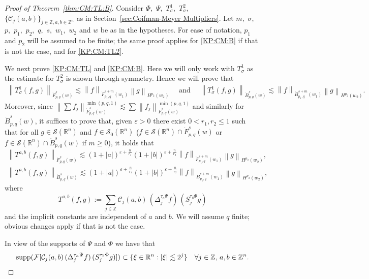 \documentclass[10pt,a4paper]{article}
\theoremstyle{remark}
\newcommand{\ent}{\mathbb{Z}}
\newcommand{\rn}{{{\mathbb R}^n}}
\newcommand{\sw}{{\mathcal{S}}(\rn)}
\newcommand{\swz}{{\mathcal{S}_0}(\rn)}
\newcommand{\tlw}[4]{\dot F_{#1,#3}^{#2}(#4)} %
\newcommand{\besw}[4]{\dot B_{#1,#3}^{#2}(#4)} %
\newcommand{\C}{\mathcal{C}}
\newcommand{\Do}[2]{\Delta^{#1}_{#2}}
\newcommand{\So}[2]{S^{#1}_{#2}}
\newcommand{\abs}[1]{\left\vert #1 \right\vert}
\newcommand{\norm}[2]{\left\|#1\right\|_{#2}}
\newcommand{\supp}{{\rm{supp}}}
\begin{document}
 \begin{proof}[Proof of Theorem~\ref{thm:CM:TL:B}] Consider $\Phi,$ $\Psi,$ $T_\sigma^1,$ $T_\sigma^2,$ $\{\C_j(a,b)\}_{j\in\ent,a,b\in\ent^n}$ as in Section~\ref{sec:Coifman-Meyer Multipliers}. Let $m,$ $\sigma,$ $p,$ $p_1,$ $p_2,$ $q,$ $s,$ $w_1,$ $w_2$ and $w$ be as in the hypotheses.  
For ease of notation, $p_1$ and $p_2$ will be assumed to be finite; the same proof applies for \eqref{KP:CM:B} if that is not the case, and for \eqref{KP:CM:TL2}.


We next prove \eqref{KP:CM:TL} and \eqref{KP:CM:B}. Here we will only work with $T_\sigma^1$ as the estimate for $T_\sigma^2$ is shown through symmetry. Hence we will prove that 
 \begin{align*}
 \norm{T^{1}_\sigma(f,g)}{\dot{F}^s_{p,q}(w)} \lesssim  \norm{f}{\dot{F}^{s+m}_{p_1, q}(w_1)} \norm{g}{H^{p_2}(w_2)}\quad  \text{ and }\quad 
 \norm{T^1_\sigma(f,g)}{\dot{B}^s_{p,q}(w)} \lesssim  \norm{f}{\dot{B}^{s+m}_{p_1, q}(w_1)} \norm{g}{H^{p_2}(w_2)}.
\end{align*}
  Moreover, since $\norm{\sum f_j}{\tlw{p}{s}{q}{w}}^{\min(p,q,1)}\lesssim \sum\norm{f_j}{\tlw{p}{s}{q}{w}}^{\min(p,q,1)}$  and similarly for $\besw{p}{s}{q}{w}$, it suffices to prove that, given $\varepsilon>0$ there exist $0<r_1,r_2\le 1$  such that for all $g\in \sw$ and  $f\in \swz$ ($f\in \sw\cap \tlw{p}{s}{q}{w}$ or  $f\in \sw\cap \besw{p}{s}{q}{w}$ if $m\ge 0$),  it holds that
\begin{align}
 \norm{T^{a,b}(f,g)}{\dot{F}^s_{p,q}(w)} \lesssim (1+\abs{a})^{\varepsilon+\frac{n}{r_1}}  (1+\abs{b})^{\varepsilon+\frac{n}{r_2}} \norm{f}{\dot{F}^{s+m}_{p_1, q}(w_1)} \norm{g}{H^{p_2}(w_2)}\label{eq:estbbTL},\\
 \norm{T^{a,b}(f,g)}{\dot{B}^s_{p,q}(w)} \lesssim (1+\abs{a})^{\varepsilon+\frac{n}{r_1}}  (1+\abs{b})^{\varepsilon+\frac{n}{r_2}} \norm{f}{\dot{B}^{s+m}_{p_1, q}(w_1)} \norm{g}{H^{p_2}(w_2)}\label{eq:estbbB},
\end{align}
where
\[
T^{a,b}(f,g):=\sum_{j\in\ent} \C_j(a,b) \,(\Do{ \tau_a \Psi }{j} f)\, (\So{ \tau_b \Phi }{j} g )
\]
and the implicit constants are independent of $a$ and $b.$  We will assume $q$ finite; obvious changes apply if that is not the case.

In view of the supports of $\Psi$ and $\Phi$ we have that 
\begin{equation*}
\supp (\mathcal{F}[\C_j(a,b) \,(\Do{ \tau_a \Psi }{j} f ) \, ( \So{ \tau_b \Phi }{j} g )])  \subset \{\xi \in \rn: |\xi| \lesssim 2^j \} \quad \forall j \in \ent,\,a,b\in \ent^n.
\end{equation*}


\end{proof}
\end{document}
